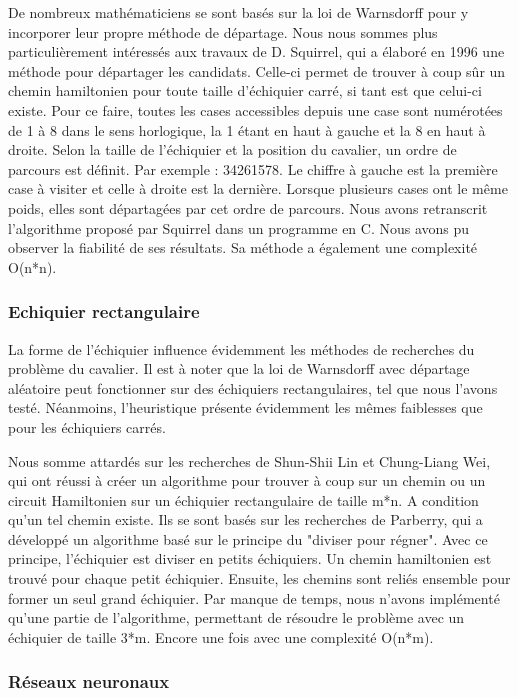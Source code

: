 De nombreux mathématiciens se sont basés sur la loi de Warnsdorff pour y incorporer leur propre méthode de départage. Nous nous sommes plus particulièrement intéressés aux travaux de D. Squirrel, qui a élaboré en 1996 une méthode pour départager les candidats. Celle-ci permet de trouver à coup sûr un chemin hamiltonien pour toute taille d'échiquier carré, si tant est que celui-ci existe. Pour ce faire, toutes les cases accessibles depuis une case sont numérotées de 1 à 8 dans le sens horlogique, la 1 étant en haut à gauche et la 8 en haut à droite. Selon la taille de l'échiquier et la position du cavalier, un ordre de parcours est définit. Par exemple : 34261578. Le chiffre à gauche est la première case à visiter et celle à droite est la dernière. Lorsque plusieurs cases ont le même poids, elles sont départagées par cet ordre de parcours. Nous avons retranscrit l'algorithme proposé par Squirrel dans un programme en C. Nous avons pu observer la fiabilité de ses résultats. Sa méthode a également une complexité O(n*n).
\subsubsection{Echiquier rectangulaire}
La forme de l'échiquier influence évidemment les méthodes de recherches du problème du cavalier. Il est à noter que la loi de Warnsdorff avec départage aléatoire peut fonctionner sur des échiquiers rectangulaires, tel que nous l'avons testé. Néanmoins, l'heuristique présente évidemment les mêmes faiblesses que pour les échiquiers carrés.

Nous somme attardés sur les recherches de Shun-Shii Lin et Chung-Liang Wei, qui ont réussi à créer un algorithme pour trouver à coup sur un chemin ou un circuit Hamiltonien sur un échiquier rectangulaire de taille m*n.  A condition qu'un tel chemin existe. Ils se sont basés sur les recherches de Parberry, qui a développé un algorithme basé sur le principe du "diviser pour régner". Avec ce principe, l'échiquier est diviser en petits échiquiers. Un chemin hamiltonien est trouvé pour chaque petit échiquier. Ensuite, les chemins sont reliés ensemble pour former un seul grand échiquier. Par manque de temps, nous n'avons implémenté qu'une partie de l'algorithme, permettant de résoudre le problème avec un échiquier de taille 3*m. Encore une fois avec une complexité O(n*m).

\subsubsection{Réseaux neuronaux}